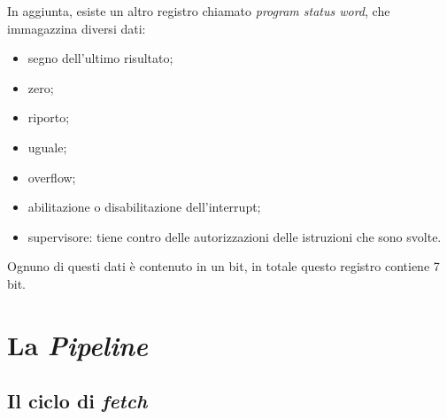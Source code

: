 \documentclass{article}
\begin{document}
In aggiunta, esiste un altro registro chiamato \textit{program status word}, che immagazzina diversi dati:
\begin{itemize}
	\item segno dell'ultimo risultato;

	\item zero;

	\item riporto;

	\item uguale;

	\item overflow;

	\item abilitazione o disabilitazione dell'interrupt;

	\item supervisore: tiene contro delle autorizzazioni delle istruzioni che sono svolte.
\end{itemize}
Ognuno di questi dati è contenuto in un bit, in totale questo registro contiene 7 bit.

\section{La \textit{Pipeline}}\label{pipeline}

\subsection{Il ciclo di \textit{fetch}}
\end{document}
